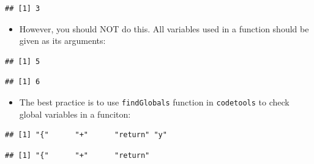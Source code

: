 \documentclass[
]{book}
\providecommand{\tightlist}{%
  \setlength{\itemsep}{0pt}\setlength{\parskip}{0pt}}
\begin{document}
\begin{verbatim}
## [1] 3
\end{verbatim}

\begin{itemize}
\tightlist
\item
  However, you should NOT do this. All variables used in a function should be given as its arguments:
\end{itemize}

\begin{verbatim}
## [1] 5
\end{verbatim}

\begin{verbatim}
## [1] 6
\end{verbatim}

\begin{itemize}
\tightlist
\item
  The best practice is to use \texttt{findGlobals} function in \texttt{codetools} to check global variables in a funciton:
\end{itemize}

\begin{verbatim}
## [1] "{"      "+"      "return" "y"
\end{verbatim}

\begin{verbatim}
## [1] "{"      "+"      "return"
\end{verbatim}
\end{document}
